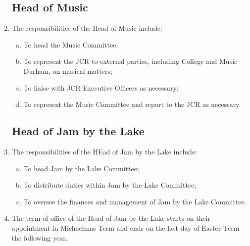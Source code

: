 \documentclass[12pt]{article}
\begin{document}
\begin{enumerate}
    \subsection{Head of Music}
    \item The responsibilities of the Head of Music include:
    \begin{enumerate}[(a)]
        \item To head the Music Committee;
        \item To represent the JCR to external parties, including College and Music Durham, on musical matters;
        \item To liaise with JCR Executive Officers as necessary;
        \item To represent the Music Committee and report to the JCR as necessary.
    \end{enumerate}

    \subsection{Head of Jam by the Lake}
    \item The responsibilities of the HEad of Jam by the Lake include:
    \begin{enumerate}[(a)]
        \item To head Jam by the Lake Committee;
        \item To distribute duties within Jam by the Lake Committee;
        \item To oversee the finances and management of Jam by the Lake Committee.
    \end{enumerate}
    \item The term of office of the Head of Jam by the Lake starts on their appointment in Michaelmas Term and ends on the last day of Easter Term the following year.
\end{enumerate}
\newpage
\end{document}
